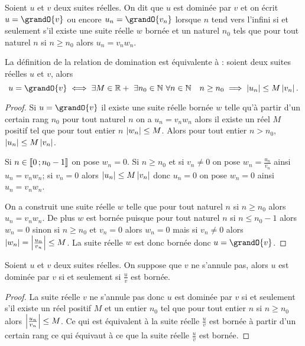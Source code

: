 \begin{defdef}
  Soient $u$ et $v$ deux suites réelles. On dit que $u$ est dominée par $v$ et on écrit $u=\grandO{v}$ ou encore $u_n=\grandO{v_n}$ lorsque $n$ tend vers l'infini si et seulement s'il existe une suite réelle $w$ bornée et un naturel $n_0$ tels que pour tout naturel $n$ si $n \geq n_0$ alors $u_n = v_n w_n$. 
\end{defdef}
\begin{prop}
  La définition de la relation de domination est équivalente à : soient deux suites réelles $u$ et $v$, alors
  \begin{equation}
    u=\grandO{v} \iff \exists M \in \R+ \ \exists n_0 \in \N \ \forall n \in \N \quad n \geq n_0 \implies \abs{u_n} \leq M \abs{v_n}.
  \end{equation}
\end{prop}
\begin{proof}
  Si $u=\grandO{v}$ il existe une suite réelle bornée $w$ telle qu'à partir d'un certain rang $n_0$ pour tout naturel $n$ on a $u_n=v_n w_n$ alors il existe un réel $M$ positif tel que pour tout entier $n$ $\left\lvert w_n\right\rvert \leq M$. Alors pour tout entier $n > n_0$, $\left\lvert u_n\right\rvert\leq M \left\lvert v_n\right\rvert$.

Si $n \in \mathopen{\llbracket}0\mathclose{}\mathpunct{};n_0-1\mathclose{\rrbracket}$ on pose $w_n=0$. Si $n \geq n_0$ et si $v_n \neq 0$ on pose $w_n = \frac{u_n}{v_n}$ ainsi $u_n = v_n w_n$; si $v_n = 0$ alors $\left\lvert u_n\right\rvert \leq M \left\lvert v_n\right\rvert$ donc $u_n=0$ on pose $w_n=0$ ainsi $u_n=v_n w_n$.

On a construit une suite réelle $w$ telle que pour tout naturel $n$ si $n \geq n_0$ alors $u_n = v_n w_n$. De plus $w$ est bornée puisque pour tout naturel $n$ si $n \leq n_0 -1$ alors $w_n=0$ sinon si $n \geq n_0$ et $v_n=0$ alors $w_n=0$ mais si $v_n \neq 0$ alors $\left\lvert w_n\right\rvert=\left\lvert\frac{u_n}{v_n}\right\rvert \leq M$. La suite réelle $w$ est donc bornée donc $u=\grandO{v}$.
\end{proof}
\begin{prop}
  Soient $u$ et $v$ deux suites réelles. On suppose que $v$ ne s'annule pas, alors $u$ est dominée par $v$ si et seulement si $\frac{u}{v}$ est bornée.
\end{prop}
\begin{proof}
  La suite réelle $v$ ne s'annule pas donc $u$ est dominée par $v$ si et seulement s'il existe un réel positif $M$ et un entier $n_0$ tel que pour tout entier $n$ si $n \geq n_0$ alors $\left\lvert\frac{u_n}{v_n}\right\rvert \leq M$. Ce qui est équivalent à la suite réelle $\frac{u}{v}$ est bornée à partir d'un certain rang ce qui équivaut à  ce que la suite réelle $\frac{u}{v}$ est bornée.
\end{proof}

